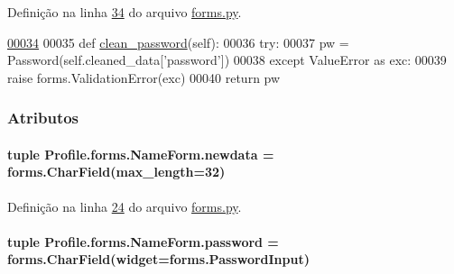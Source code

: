 Definição na linha \hyperlink{Profile_2forms_8py_source_l00034}{34} do arquivo \hyperlink{Profile_2forms_8py_source}{forms.\-py}.


\begin{DoxyCode}
\hypertarget{classProfile_1_1forms_1_1NameForm_l00034}{}\hyperlink{classProfile_1_1forms_1_1NameForm_a681fa28036a241632b8688d436f04a49}{00034} 
00035     \textcolor{keyword}{def }\hyperlink{classProfile_1_1forms_1_1NameForm_a681fa28036a241632b8688d436f04a49}{clean\_password}(self):
00036         \textcolor{keywordflow}{try}:
00037             pw = Password(self.cleaned\_data[\textcolor{stringliteral}{'password'}])
00038         \textcolor{keywordflow}{except} ValueError \textcolor{keyword}{as} exc:
00039             \textcolor{keywordflow}{raise} forms.ValidationError(exc)
00040         \textcolor{keywordflow}{return} pw

\end{DoxyCode}


\subsubsection{Atributos}
\hypertarget{classProfile_1_1forms_1_1NameForm_a6ebfb316b263c162dd3895b1da149eda}{
\paragraph[{newdata}]{\setlength{\rightskip}{0pt plus 5cm}tuple Profile.\-forms.\-Name\-Form.\-newdata = forms.\-Char\-Field(max\-\_\-length=32)\hspace{0.3cm}{\ttfamily [static]}}}\label{classProfile_1_1forms_1_1NameForm_a6ebfb316b263c162dd3895b1da149eda}


Definição na linha \hyperlink{Profile_2forms_8py_source_l00024}{24} do arquivo \hyperlink{Profile_2forms_8py_source}{forms.\-py}.

\hypertarget{classProfile_1_1forms_1_1NameForm_a5a6959db0132c607a56f9cda75769ecf}{
\paragraph[{password}]{\setlength{\rightskip}{0pt plus 5cm}tuple Profile.\-forms.\-Name\-Form.\-password = forms.\-Char\-Field(widget=forms.\-Password\-Input)\hspace{0.3cm}{\ttfamily [static]}}}\label{classProfile_1_1forms_1_1NameForm_a5a6959db0132c607a56f9cda75769ecf}


